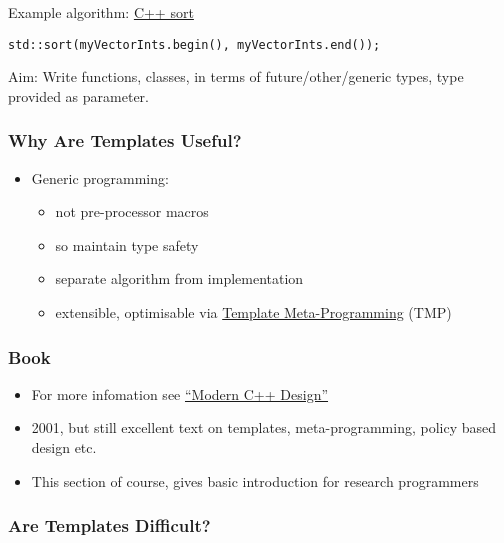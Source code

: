 Example algorithm:
\href{http://www.cplusplus.com/reference/algorithm/sort/}{C++ sort}

\begin{verbatim}
std::sort(myVectorInts.begin(), myVectorInts.end());
\end{verbatim}

Aim: Write functions, classes, in terms of future/other/generic types,
type provided as parameter.

\subsubsection{Why Are Templates
Useful?}\label{why-are-templates-useful}

\begin{itemize}
\itemsep1pt\parskip0pt
\item
  Generic programming:

  \begin{itemize}
  \itemsep1pt\parskip0pt
  \item
    not pre-processor macros
  \item
    so maintain type safety
  \item
    separate algorithm from implementation
  \item
    extensible, optimisable via \href{97TemplateMetaProg}{Template
    Meta-Programming} (TMP)
  \end{itemize}
\end{itemize}

\subsubsection{Book}\label{book}

\begin{itemize}
\itemsep1pt\parskip0pt
\item
  For more infomation see
  \href{http://erdani.com/index.php/books/modern-c-design/}{``Modern C++
  Design''}
\item
  2001, but still excellent text on templates, meta-programming, policy
  based design etc.
\item
  This section of course, gives basic introduction for research
  programmers
\end{itemize}

\subsubsection{Are Templates Difficult?}\label{are-templates-difficult}

